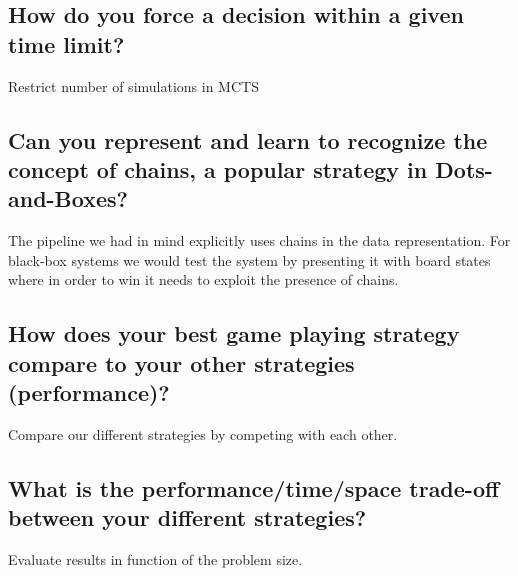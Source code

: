 \documentclass[11pt,a4paper]{article}
\begin{document}
	\subsection{How do you force a decision within a given time limit?}
	Restrict number of simulations in MCTS
	
	\subsection{Can you represent and learn to recognize the concept of chains, a popular strategy in Dots-and-Boxes?}
	The pipeline we had in mind explicitly uses chains in the data representation. For black-box systems we would test the system by presenting it with board states where in order to win it needs to exploit the presence of chains.
	
	\subsection{How does your best game playing strategy compare to your other strategies (performance)?}
	Compare our different strategies by competing with each other.
	
	\subsection{What is the performance/time/space trade-off between your different strategies?}
	Evaluate results in function of the problem size.
	
\end{document}
